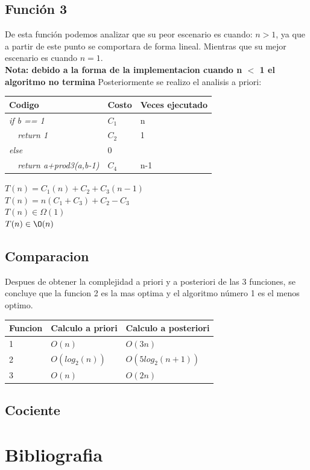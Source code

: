 \documentclass[spanish]{article}
\begin{document}
				\subsection*{Función 3}
					De esta función podemos analizar que su peor escenario es cuando: $n>1$, ya que a partir de este punto se comportara de forma lineal. Mientras que su mejor escenario es cuando $n=1$.\\
					\textbf{Nota: debido a la forma de la implementacion cuando n $<$ 1 el algoritmo no termina}
					Posteriormente se realizo el analisis a priori:\\
					\begin{center}
						\begin{table}[H]
							\begin{tabular}{|l|l|l|}
								\hline
								\rowcolor[HTML]{FFCC67} 
								Codigo                               & Costo & Veces ejecutado \\ \hline
								\textit{if b == 1}                   & $C_1$   & n               \\ \hline
								\textit{\  \  return 1}              & $C_2$   & 1               \\ \hline
								\textit{else}                        & 0     &                 \\ \hline
								\textit{\  \  return a+prod3(a,b-1)} & $C_4$   & n-1             \\ \hline
							\end{tabular}
						\end{table}
						$T(n) = C_1(n) + C_2 + C_3(n-1)$\\
						$T(n) = n(C_1+C_3) + C_2 - C_3$\\
						$T(n) \in \Omega(1)$\\
						$T(n) \in \O(n)$
					\end{center}
				\subsection*{Comparacion}
				Despues de obtener la complejidad a priori y a posteriori de las 3 funciones, se concluye que la funcion 2 es la mas optima y el algoritmo número 1 es el menos optimo.
				\begin{table}[H]
					\begin{tabular}{|l|l|l|}
						\hline
						\rowcolor[HTML]{FFCC67} 
						Funcion & Calculo a priori & Calculo a posteriori \\ \hline
						\rowcolor[HTML]{FE0000} 
						1       & $O(n)$           & $O(3n)$              \\ \hline
						\rowcolor[HTML]{32CB00} 
						2       & $O(log_2(n))$    & $O(5log_2(n+1))$     \\ \hline
						\rowcolor[HTML]{F8FF00} 
						3       & $O(n)$           & $O(2n)$              \\ \hline
					\end{tabular}
				\end{table}
			\subsection*{Cociente}
		\section{Bibliografia}
\end{document}

